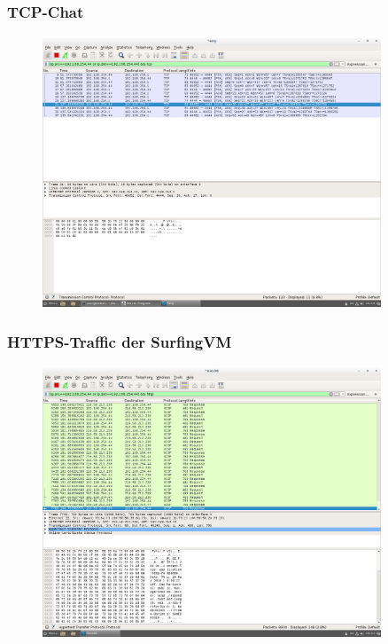 \documentclass[12pt]{article}
\theoremstyle{plain}
\begin{document}
\subsubsection*{TCP-Chat}
\begin{figure}[!ht]
	\centering
     \includegraphics[width=0.9\textwidth]{Bilder/tcp-chat_1.png}
\end{figure}
\newpage
\subsubsection*{HTTPS-Traffic der SurfingVM}
\begin{figure}[!ht]
	\centering
     \includegraphics[width=0.9\textwidth]{Bilder/https_traffic_surfingvm.png}
\end{figure}
\newpage
\end{document}
